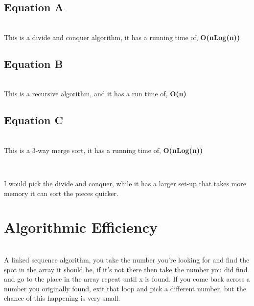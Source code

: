 \documentclass[12pt]{amsart}
\begin{document}
\subsection*{Equation A}
\leavevmode \\
This is a divide and conquer algorithm, it has a running time of, \textbf{O(nLog(n))}
\\
\subsection*{Equation B}
\leavevmode \\
This is a recursive algorithm, and it has a run time of, \textbf{O(n)}
\\
\subsection*{Equation C}
\leavevmode \\
This is a 3-way merge sort, it has a running time of, \textbf{O(nLog(n))}
\\
\subsection*{}
\leavevmode \\
I would pick the divide and conquer, while it has a larger set-up that takes more memory it can sort the pieces quicker.

\pagebreak

\section{Algorithmic Efficiency}
\leavevmode \\
A linked sequence algorithm,   you take the number you’re looking for and find the spot in the array it should be, if it’s not there then take the number you did find and go to the place in the array repeat until x is found.   If you come back across a number you originally found, exit that loop and pick a different number, but the chance of this happening is very small.
\end{document}
